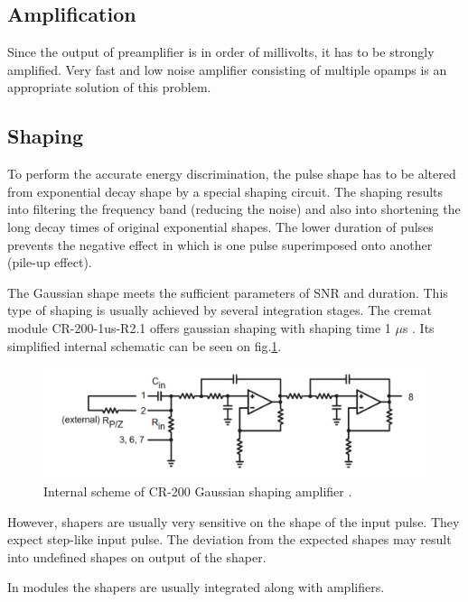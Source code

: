 \subsection{Amplification}
Since the output of preamplifier is in order of millivolts, it has to be strongly amplified. Very fast and low noise amplifier consisting of multiple opamps is an appropriate solution of this problem.



\subsection{Shaping}

To perform the accurate energy discrimination, the pulse shape has to be altered from exponential decay shape by a special shaping circuit. The shaping results into filtering the frequency band (reducing the noise) and also into shortening the long decay times of original exponential shapes. The lower duration of pulses prevents the negative effect in which is one pulse superimposed onto another (pile-up effect).

\par
The Gaussian shape meets the sufficient parameters of SNR and duration. This type of shaping is usually achieved by several integration stages. The cremat module CR-200-1us-R2.1 offers gaussian shaping with shaping time 1 $\mu$s \cite{cr200}. Its simplified internal schematic can be seen on fig.\ref{internal2}. 


\begin{figure}[H]
 \centering
 \includegraphics[scale=0.35, angle = 0]{./pictures/CRshaper.png}
 \caption{Internal scheme of CR-200 Gaussian shaping amplifier \cite{cr200}.}
 \label{internal2}
 
\end{figure}

However, shapers are usually very sensitive on the shape of the input pulse. They expect step-like input pulse. The deviation from the expected shapes may result into undefined shapes on output of the shaper.
\par
In modules the shapers are usually integrated along with amplifiers.

